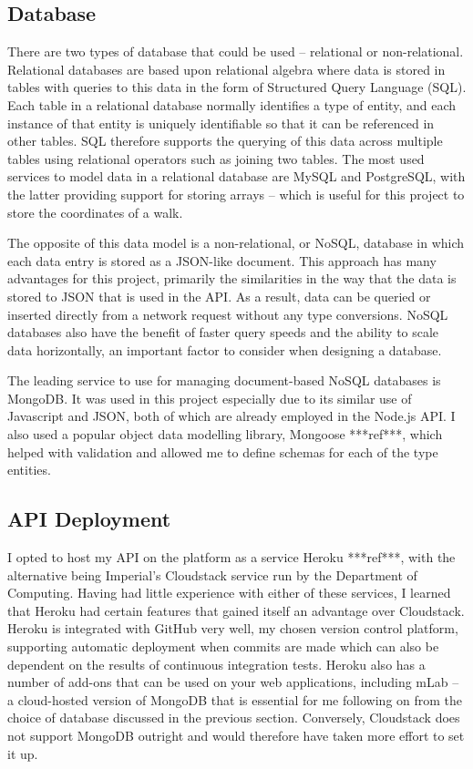\subsection{Database}

There are two types of database that could be used -- relational or non-relational. Relational databases are based upon relational algebra where data is stored in tables with queries to this data in the form of Structured Query Language (SQL). Each table in a relational database normally identifies a type of entity, and each instance of that entity is uniquely identifiable so that it can be referenced in other tables. SQL therefore supports the querying of this data across multiple tables using relational operators such as joining two tables. The most used services to model data in a relational database are MySQL and PostgreSQL, with the latter providing support for storing arrays -- which is useful for this project to store the coordinates of a walk.

The opposite of this data model is a non-relational, or NoSQL, database in which each data entry is stored as a JSON-like document. This approach has many advantages for this project, primarily the similarities in the way that the data is stored to JSON that is used in the API. As a result, data can be queried or inserted directly from a network request without any type conversions. NoSQL databases also have the benefit of faster query speeds and the ability to scale data horizontally, an important factor to consider when designing a database.

The leading service to use for managing document-based NoSQL databases is MongoDB. It was used in this project especially due to its similar use of Javascript and JSON, both of which are already employed in the Node.js API. I also used a popular object data modelling library, Mongoose ***ref***, which helped with validation and allowed me to define schemas for each of the type entities.

\subsection{API Deployment}

I opted to host my API on the platform as a service Heroku ***ref***, with the alternative being Imperial's Cloudstack service run by the Department of Computing. Having had little experience with either of these services, I learned that Heroku had certain features that gained itself an advantage over Cloudstack. Heroku is integrated with GitHub very well, my chosen version control platform, supporting automatic deployment when commits are made which can also be dependent on the results of continuous integration tests. Heroku also has a number of add-ons that can be used on your web applications, including mLab -- a cloud-hosted version of MongoDB that is essential for me following on from the choice of database discussed in the previous section. Conversely, Cloudstack does not support MongoDB outright and would therefore have taken more effort to set it up.

